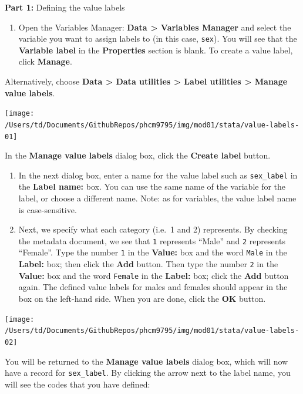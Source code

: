 \documentclass[
]{memoir}
\providecommand{\tightlist}{%
  \setlength{\itemsep}{0pt}\setlength{\parskip}{0pt}}
\begin{document}
\textbf{Part 1:} Defining the value labels

\begin{enumerate}
\def\labelenumi{\arabic{enumi}.}
\tightlist
\item
  Open the Variables Manager: \textbf{Data \textgreater{} Variables Manager} and select the variable you want to assign labels to (in this case, \texttt{sex}). You will see that the \textbf{Variable label} in the \textbf{Properties} section is blank. To create a value label, click \textbf{Manage}.
\end{enumerate}

Alternatively, choose \textbf{Data \textgreater{} Data utilities \textgreater{} Label utilities \textgreater{} Manage value labels}.

\texttt{[image: /Users/td/Documents/GithubRepos/phcm9795/img/mod01/stata/value-labels-01]}

In the \textbf{Manage value labels} dialog box, click the \textbf{Create label} button.

\begin{enumerate}
\def\labelenumi{\arabic{enumi}.}
\setcounter{enumi}{1}
\item
  In the next dialog box, enter a name for the value label such as \texttt{sex\_label} in the \textbf{Label name:} box. You can use the same name of the variable for the label, or choose a different name. Note: as for variables, the value label name is case-sensitive.
\item
  Next, we specify what each category (i.e.~1 and 2) represents. By checking the metadata document, we see that \texttt{1} represents ``Male'' and \texttt{2} represents ``Female''. Type the number \texttt{1} in the \textbf{Value:} box and the word \texttt{Male} in the \textbf{Label:} box; then click the \textbf{Add} button. Then type the number \texttt{2} in the \textbf{Value:} box and the word \texttt{Female} in the \textbf{Label:} box; click the \textbf{Add} button again. The defined value labels for males and females should appear in the box on the left-hand side. When you are done, click the \textbf{OK} button.
\end{enumerate}

\texttt{[image: /Users/td/Documents/GithubRepos/phcm9795/img/mod01/stata/value-labels-02]}

You will be returned to the \textbf{Manage value labels} dialog box, which will now have a record for \texttt{sex\_label}. By clicking the arrow next to the label name, you will see the codes that you have defined:
\end{document}
